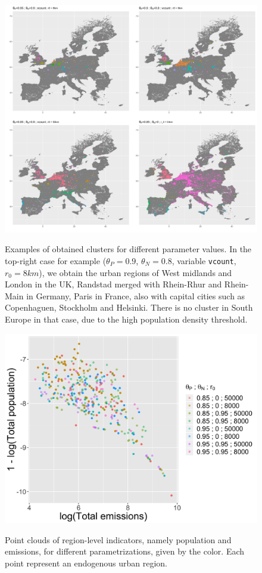 \documentclass{jimis-en}
\begin{document}
\begin{figure}[h!] 
{\includegraphics[width=\linewidth]{Fig4.png}}
  \centering
  \caption{Examples of obtained clusters for different parameter values. In the top-right case for example ($\theta_P = 0.9$, $\theta_N = 0.8$, variable \texttt{vcount},$r_0 = 8km$), we obtain the urban regions of West midlands and London in the UK, Randstad merged with Rhein-Rhur and Rhein-Main in Germany, Paris in France, also with capital cities such as Copenhaguen, Stockholm and Helsinki. There is no cluster in South Europe in that case, due to the high population density threshold.\label{fig:exclusters}}
\end{figure}


\begin{figure}[h!] 
  {\includegraphics[width=0.7\linewidth]{Fig5.png}}
  \centering
  \caption{Point clouds of region-level indicators, namely population and emissions, for different parametrizations, given by the color. Each point represent an endogenous urban region.\label{fig:paretos}}
\end{figure}
\end{document}
